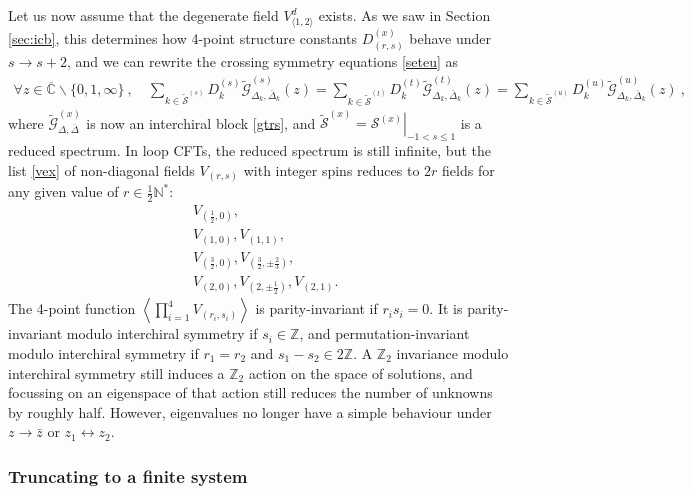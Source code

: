 \documentclass[12pt, a4paper]{article}
\begin{document}
Let us now assume that the degenerate field $V^d_{\langle 1,2\rangle}$ exists. 
As we saw in Section \ref{sec:icb}, this determines how 4-point structure constants $D^{(x)}_{(r,s)}$ behave under $s\to s+2$, and we can rewrite the crossing symmetry equations \eqref{seteu} as 
\begin{align}
 \forall z\in \overline{\mathbb{C}}\backslash\{0,1,\infty\} \ , \quad \sum_{k\in\widetilde{\mathcal{S}}^{(s)}} D_k^{(s)} \widetilde{\mathcal{G}}^{(s)}_{\Delta_k,\bar\Delta_k}(z) = \sum_{k\in\widetilde{\mathcal{S}}^{(t)}} D_k^{(t)} \widetilde{\mathcal{G}}^{(t)}_{\Delta_k,\bar\Delta_k}(z) = \sum_{k\in\widetilde{\mathcal{S}}^{(u)}} D_k^{(u)} \widetilde{\mathcal{G}}^{(u)}_{\Delta_k,\bar\Delta_k}(z)\ ,
\end{align}
where $\widetilde{\mathcal{G}}^{(x)}_{\Delta,\bar\Delta}$ is now an interchiral block \eqref{gtrs}, and $\widetilde{\mathcal{S}}^{(x)}=\left.\mathcal{S}^{(x)}\right|_{-1<s\leq 1}$ is a reduced spectrum. In loop CFTs, the reduced spectrum is still infinite, but the list \eqref{vex} of non-diagonal fields $V_{(r,s)}$ with integer spins reduces to $2r$ fields for any given value of $r\in\frac12\mathbb{N}^*$:
\begin{subequations}
\label{vexr}
\begin{align}
 & V_{(\frac12, 0)},
 \\
 & V_{(1,0)}, V_{(1,1)}, 
 \\
 & V_{(\frac32, 0)}, V_{(\frac32, \pm\frac23)}, 
 \\
 & V_{(2, 0)}, V_{(2,\pm\frac12)}, V_{(2,1)}.
\end{align}
\end{subequations}
The 4-point function $\left<\prod_{i=1}^4 V_{(r_i,s_i)}\right>$ is parity-invariant if $r_is_i=0$. It is parity-invariant 
modulo interchiral symmetry if $s_i\in\mathbb{Z}$, and permutation-invariant modulo interchiral symmetry if $r_1=r_2$ and $s_1-s_2\in 2\mathbb{Z}$. A $\mathbb{Z}_2$ invariance modulo interchiral symmetry still induces a $\mathbb{Z}_2$ action on the space of solutions, and focussing on an eigenspace of that action still reduces the number of unknowns by roughly half. However, eigenvalues no longer have a simple behaviour under $z\to \bar z$ or $z_1\leftrightarrow z_2$.


\subsubsection{Truncating to a finite system}
\end{document}
